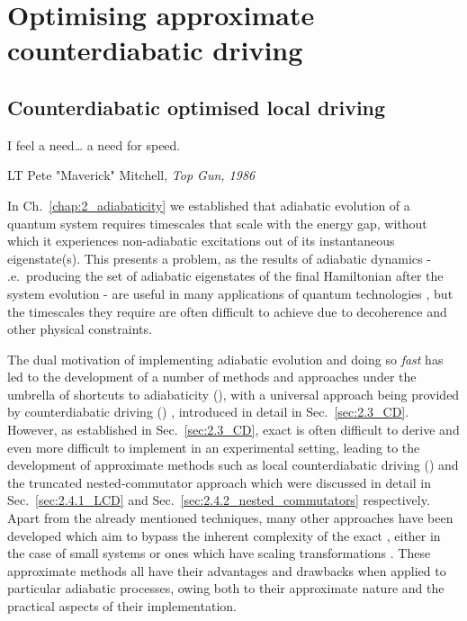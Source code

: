 \part{Optimising approximate counterdiabatic driving}\label{part:COLD}

\chapter{Counterdiabatic optimised local driving}\label{chap:4_COLD}

\epigraph{I feel a need… a need for speed.}{LT Pete "Maverick" Mitchell, \emph{Top Gun, 1986}}

In Ch.~\ref{chap:2_adiabaticity} we established that adiabatic evolution of a quantum system requires timescales that scale with the energy gap, without which it experiences non-adiabatic excitations out of its instantaneous eigenstate(s). This presents a problem, as the results of adiabatic dynamics - \@i.e.~producing the set of adiabatic eigenstates of the final Hamiltonian after the system evolution - are useful in many applications of quantum technologies \cite{dimitrova_many-body_2023, campo_more_2014, ebadi_quantum_2022}, but the timescales they require are often difficult to achieve due to decoherence and other physical constraints. 

The dual motivation of implementing adiabatic evolution and doing so \emph{fast} has led to the development of a number of methods and approaches under the umbrella of shortcuts to adiabaticity ()\cite{guery-odelin_shortcuts_2019, torrontegui_chapter_2013}, with a universal  approach being provided by counterdiabatic driving () \cite{berry_transitionless_2009, demirplak_adiabatic_2003}, introduced in detail in Sec.~\ref{sec:2.3_CD}. However, as established in Sec.~\ref{sec:2.3_CD}, exact  is often difficult to derive and even more difficult to implement in an experimental setting, leading to the development of approximate methods such as local counterdiabatic driving \cite{sels_minimizing_2017} () and the truncated nested-commutator approach \cite{claeys_floquet-engineering_2019} which were discussed in detail in Sec.~\ref{sec:2.4.1_LCD} and Sec.~\ref{sec:2.4.2_nested_commutators} respectively. Apart from the already mentioned techniques, many other approaches \cite{saberi_adiabatic_2014, campbell_shortcut_2015, whitty_quantum_2020} have been developed which aim to bypass the inherent complexity of the exact , either in the case of small systems or ones which have scaling transformations \cite{del_campo_shortcuts_2013, deffner_classical_2014, deng_superadiabatic_2018}. These approximate methods all have their advantages and drawbacks when applied to particular adiabatic processes, owing both to their approximate nature and the practical aspects of their implementation.  

